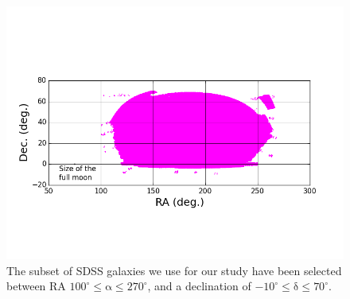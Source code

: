 \begin{figure}
\begin{center}
\includegraphics[width=\textwidth]{images/ClusterEnvironment/sdss_data.png}
\end{center}
\caption[The Galaxy Sample Defined]{The subset of SDSS galaxies we use for our study have been selected
  between RA $\mathrm{100^{\circ} \le \alpha \le 270^{\circ}}$, and a declination
of $\mathrm{ -10^{\circ} \le \delta \le 70^{\circ} }$.}
\end{figure}

